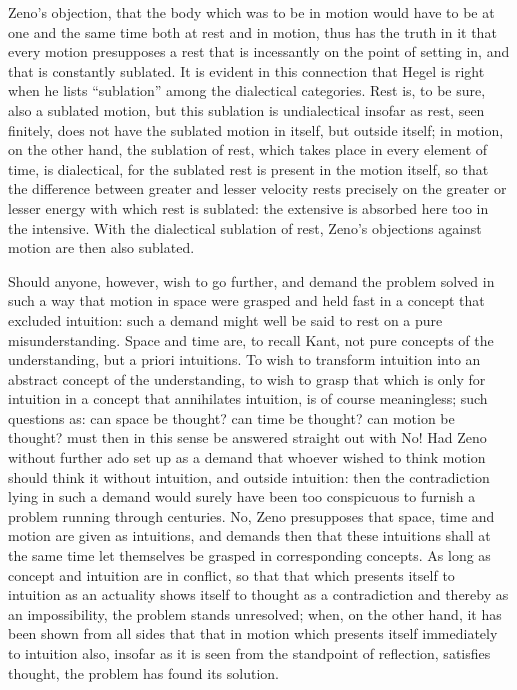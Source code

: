 \documentclass[12pt,a4paper,openany]{book}
\newcommand{\opage}[1]{\marginnote{\footnotesize\textit{[#1]}}}
\begin{document}
Zeno's objection, that the body which was to be in motion would have to be at one and the same time both at rest and in motion, thus has the truth in it that every motion presupposes a rest that is incessantly on the point of setting in, and that is constantly sublated. It is evident in this connection that Hegel is right when he lists ``sublation'' among the dialectical categories. Rest is, to be sure, also a sublated motion, but this sublation is undialectical insofar as rest, seen finitely, does not have the sublated motion in itself, but outside itself; in motion, on the other hand, the sublation of rest, which takes place in every element of time, is dialectical, for the sublated rest is present in the motion itself, so that the difference between greater and lesser velocity rests precisely on the greater or lesser energy with which rest is sublated: the extensive is absorbed here too in the intensive. With the dialectical sublation of rest, Zeno's objections against motion are then also sublated.

Should anyone, however, wish to go further, and demand the problem solved in such a way that motion in space were grasped and held fast in a concept that excluded intuition: such a demand might well be said to rest on a pure misunderstanding. Space and time are, to recall Kant, not pure concepts of the understanding, but a priori intuitions. To wish to
\setcounter{footnote}{0}%
\opage{146}transform intuition into an abstract concept of the understanding, to wish to grasp that which is only for intuition in a concept that annihilates intuition, is of course meaningless; such questions as: can space be thought? can time be thought? can motion be thought? must then in this sense be answered straight out with No! Had Zeno without further ado set up as a demand that whoever wished to think motion should think it without intuition, and outside intuition: then the contradiction lying in such a demand would surely have been too conspicuous to furnish a problem running through centuries. No, Zeno presupposes that space, time and motion are given as intuitions, and demands then that these intuitions shall at the same time let themselves be grasped in corresponding concepts. As long as concept and intuition %
are in conflict, so that that which presents itself to intuition as an actuality shows itself to thought as a contradiction and thereby as an impossibility, the problem stands unresolved; when, on the other hand, it has been shown from all sides that that in motion which presents itself immediately to intuition also, insofar as it is seen from the standpoint of reflection, satisfies thought, the problem has found its solution.
\end{document}
